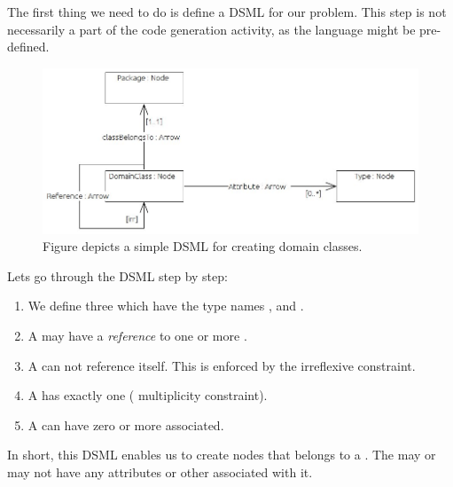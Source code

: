 The first thing we need to do is define a DSML for our problem. This step is not necessarily a part of the code generation activity, as the language might be pre-defined.

\begin{figure}[h]
  \centering
  \centerline{\includegraphics[scale=0.5]{images/web_dsml.jpeg}}
  \caption[DSML for dpfplay]{Figure depicts a simple DSML for creating domain classes.}
  \label{fig:web_dsml}
\end{figure}

Lets go through the DSML step by step:
\begin{enumerate}
  \item We define three  which have the type names ,  and .
  \item A  may have a \emph{reference} to one or more .
  \item A  can not reference itself. This is enforced by the irreflexive \codeText{[irr]} constraint.
  \item A  has exactly one  (\codeText{[1..1]} multiplicity constraint).
  \item A  can have zero or more  associated.
\end{enumerate}

In short, this DSML enables us to create  nodes that belongs to a . The  may or may not have any attributes or other  associated with it.

